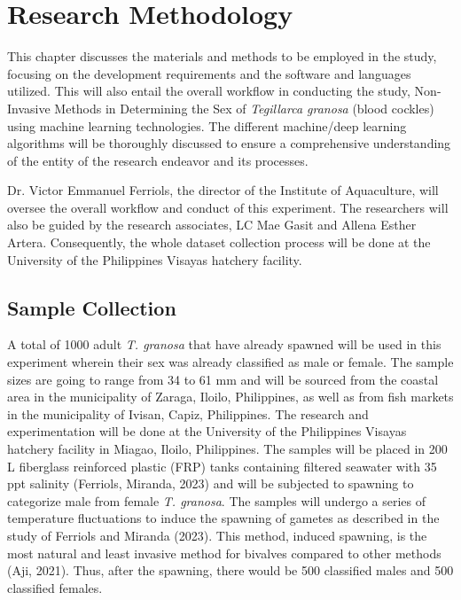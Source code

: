 \chapter{Research Methodology}

This chapter discusses the materials and methods to be employed in the study, focusing on the development requirements and the software and languages utilized. This will also entail the overall workflow in conducting the study, Non-Invasive Methods in Determining the Sex of \textit{Tegillarca granosa} (blood cockles) using machine learning technologies. The different machine/deep learning algorithms will be thoroughly discussed to ensure a comprehensive understanding of the entity of the research endeavor and its processes. 

Dr. Victor Emmanuel Ferriols, the director of the Institute of Aquaculture, will oversee the overall workflow and conduct of this experiment. The researchers will also be guided by the research associates, LC Mae Gasit and Allena Esther Artera. Consequently, the whole dataset collection process will be done at the University of the Philippines Visayas hatchery facility. 



\section{Sample Collection}
A total of 1000 adult \textit{T. granosa} that have already spawned will be used in this experiment wherein their sex was already classified as male or female. The sample sizes are going to range from 34 to 61 mm and will be sourced from the coastal area in the municipality of Zaraga, Iloilo, Philippines, as well as from fish markets in the municipality of Ivisan, Capiz, Philippines. The research and experimentation will be done at the University of the Philippines Visayas hatchery facility in Miagao, Iloilo, Philippines. The samples will be placed in 200 L fiberglass reinforced plastic (FRP) tanks containing filtered seawater with 35 ppt salinity (Ferriols, Miranda, 2023) and will be subjected to spawning to categorize male from female \textit{T. granosa}. The samples will undergo a series of temperature fluctuations to induce the spawning of gametes as described in the study of Ferriols and Miranda (2023). This method, induced spawning, is the most natural and least invasive method for bivalves compared to other methods (Aji, 2021). Thus, after the spawning, there would be 500 classified males and 500 classified females. 


